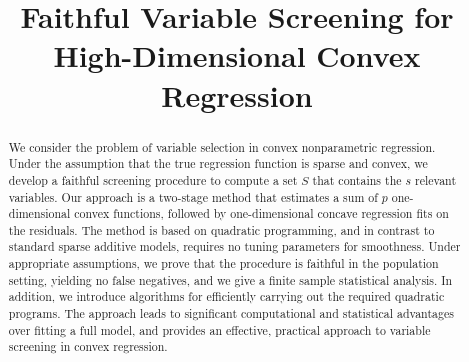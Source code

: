 \documentclass[12pt,pdftex,aos]{imsart}
\numberwithin{equation}{section}
\theoremstyle{plain}
\theoremstyle{remark}
\def\comma{\unskip,~}
\begin{document}
\begin{frontmatter}
\title{Faithful Variable Screening for High-Dimensional Convex Regression}



\begin{abstract}
  We consider the problem of variable selection in convex nonparametric
  regression.  Under the assumption that the true regression
  function is sparse and convex, we
  develop a faithful screening procedure to compute a set $S$ that
  contains the $s$ relevant variables. Our approach is a two-stage
  method that estimates a sum of $p$ one-dimensional convex functions,
  followed by one-dimensional concave regression fits on the
  residuals. The method is based on quadratic programming, and in
  contrast to standard sparse additive models, requires no tuning
  parameters for smoothness. Under appropriate assumptions, we prove
  that the procedure is faithful in the population setting, yielding
  no false negatives, and we give a finite sample statistical
  analysis. In addition, we introduce algorithms for efficiently
  carrying out the required quadratic programs. The approach leads to
  significant computational and statistical advantages over fitting a
  full model, and provides an effective, practical approach to
  variable screening in convex regression.
\end{abstract}

\begin{keyword}
\end{keyword}

\vskip20pt
\end{frontmatter}
\end{document}
